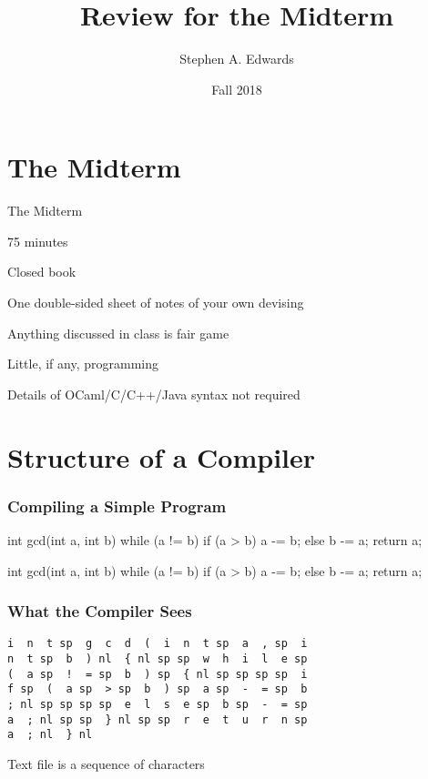 \documentclass{plt}
\title{Review for the Midterm}
\author{Stephen A. Edwards}
\institute{Columbia University}
\date{Fall 2018}
\begin{document}
\frame{\titlepage}

\frame{\footnotesize\parskip=0pt\tableofcontents}

\section{The Midterm}

\begin{frame}{The Midterm}

75 minutes

Closed book

One double-sided sheet of notes of your own devising

Anything discussed in class is fair game

Little, if any, programming

Details of OCaml/C/C++/Java syntax not required

\end{frame}

\section{Structure of a Compiler}

\begin{frame}[fragile]
  \frametitle{Compiling a Simple Program}

\begin{C}
int gcd(int a, int b)
{
  while (a != b) {
    if (a > b) a -= b;
    else b -= a;
  }
  return a;
}
\end{C}

\end{frame}

\newsavebox{\gcdbox}
\begin{lrbox}{\gcdbox}
\begin{minipage}{0.4\textwidth}
\begin{C}
int gcd(int a, int b)
{
  while (a != b) {
    if (a > b) a -= b;
    else b -= a;
  }
  return a;
}
\end{C}
\end{minipage}
\end{lrbox}


\begin{frame}[fragile]
  \frametitle{What the Compiler Sees}

\usebox{\gcdbox}

\begin{verbatim}
i  n  t sp  g  c  d  (  i  n  t sp  a  , sp  i
n  t sp  b  ) nl  { nl sp sp  w  h  i  l  e sp
(  a sp  !  = sp  b  ) sp  { nl sp sp sp sp  i
f sp  (  a sp  > sp  b  ) sp  a sp  -  = sp  b
; nl sp sp sp sp  e  l  s  e sp  b sp  -  = sp
a  ; nl sp sp  } nl sp sp  r  e  t  u  r  n sp
a  ; nl  } nl
\end{verbatim}

Text file is a sequence of characters

\end{frame}
\end{document}
